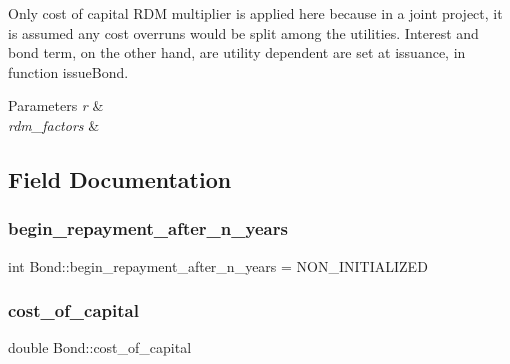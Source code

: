 Only cost of capital R\+DM multiplier is applied here because in a joint project, it is assumed any cost overruns would be split among the utilities. Interest and bond term, on the other hand, are utility dependent are set at issuance, in function issue\+Bond. 
\begin{DoxyParams}{Parameters}
{\em r} & \\
\hline
{\em rdm\+\_\+factors} & \\
\hline
\end{DoxyParams}


\subsection{Field Documentation}
\mbox{\label{classBond_a8d808753f9708e841dfceca72a110737_a8d808753f9708e841dfceca72a110737}} 
\subsubsection{\texorpdfstring{begin\+\_\+repayment\+\_\+after\+\_\+n\+\_\+years}{begin\_repayment\_after\_n\_years}}
{\footnotesize\ttfamily int Bond\+::begin\+\_\+repayment\+\_\+after\+\_\+n\+\_\+years = N\+O\+N\+\_\+\+I\+N\+I\+T\+I\+A\+L\+I\+Z\+ED\hspace{0.3cm}{\ttfamily [protected]}}

\mbox{\label{classBond_ad98df7d28b398e620286f95ee085439b_ad98df7d28b398e620286f95ee085439b}} 
\subsubsection{\texorpdfstring{cost\+\_\+of\+\_\+capital}{cost\_of\_capital}}
{\footnotesize\ttfamily double Bond\+::cost\+\_\+of\+\_\+capital\hspace{0.3cm}{\ttfamily [protected]}}

\mbox{\label{classBond_a5f66785534e24caa43d9f730130a6463_a5f66785534e24caa43d9f730130a6463}} 
